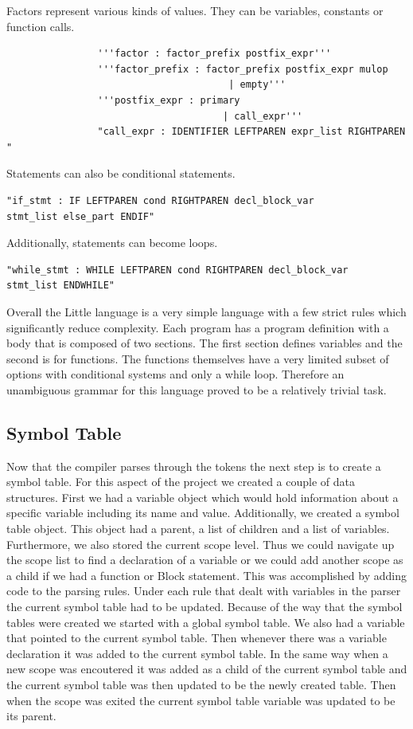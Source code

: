 \documentclass[12pt]{article}
\begin{document}
			Factors represent various kinds of values.  They can be variables, constants or function calls.
			
			\begin{verbatim}
				'''factor : factor_prefix postfix_expr'''
				'''factor_prefix : factor_prefix postfix_expr mulop
				                       | empty'''
				'''postfix_expr : primary
			                          | call_expr'''  
			    "call_expr : IDENTIFIER LEFTPAREN expr_list RIGHTPAREN "                                          
			\end{verbatim}	
			
			Statements can also be conditional statements.
			\begin{verbatim}
"if_stmt : IF LEFTPAREN cond RIGHTPAREN decl_block_var
stmt_list else_part ENDIF"
            \end{verbatim}	
           
            Additionally, statements can become loops.
            \begin{verbatim}
"while_stmt : WHILE LEFTPAREN cond RIGHTPAREN decl_block_var
stmt_list ENDWHILE"
            \end{verbatim}
           
    		
    		Overall the Little language is a very simple language with a few strict rules which significantly reduce complexity.  Each program has a program definition with a body that is composed of two sections.  The first section defines variables and the second is for functions.  The functions themselves have a very limited subset of options with conditional systems and only a while loop.  Therefore an unambiguous grammar for this language proved to be a relatively trivial task.  
    		

    	\subsection{Symbol Table}
    		Now that the compiler parses through the tokens the next step is to create a symbol table.  For this aspect of the project we created a couple of data structures.  First we had a variable object which would hold information about a specific variable including its name and value.  Additionally, we created a symbol table object.  This object had a parent, a list of children and a list of variables.  Furthermore, we also stored the current scope level.  Thus we could navigate up the scope list to find a declaration of a variable or we could add another scope as a child if we had a function or Block statement.  
    		This was accomplished by adding code to the parsing rules.  Under each rule that dealt with variables in the parser the current symbol table had to be updated.  Because of the way that the symbol tables were created we started with a global symbol table.  We also had a variable that pointed to the current symbol table.  Then whenever there was a variable declaration it was added to the current symbol table.  In the same way when a new scope was encoutered it was added as a child of the current symbol table and the current symbol table was then updated to be the newly created table.  Then when the scope was exited the current symbol table variable was updated to be its parent. 
    		
\end{document}
